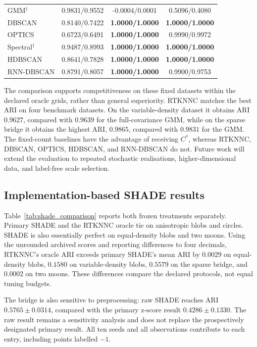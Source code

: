 \documentclass[pdflatex,sn-basic,Numbered]{sn-jnl}
\begin{document}
\begin{table}[t]
\begin{tabular}{@{}lccc@{}}
GMM$^\dagger$ & 0.9831/0.9552 & -0.0004/0.0001 & 0.5096/0.4080 \\
DBSCAN & 0.8140/0.7422 & \textbf{1.0000/1.0000} & \textbf{1.0000/1.0000} \\
OPTICS & 0.6723/0.6491 & \textbf{1.0000/1.0000} & 0.9990/0.9972 \\
Spectral$^\dagger$ & 0.9487/0.8993 & \textbf{1.0000/1.0000} & \textbf{1.0000/1.0000} \\
HDBSCAN & 0.8641/0.7828 & \textbf{1.0000/1.0000} & \textbf{1.0000/1.0000} \\
RNN-DBSCAN & 0.8791/0.8057 & \textbf{1.0000/1.0000} & 0.9900/0.9753 \\
\bottomrule
\end{tabular}
\end{table}

The comparison supports competitiveness on these fixed datasets within the
declared oracle grids, rather than general superiority. RTKNNC matches the best ARI on four benchmark datasets. On the
variable-density dataset it obtains ARI $0.9627$, compared with $0.9639$ for
the full-covariance GMM, while on the sparse bridge it obtains the highest ARI,
$0.9865$, compared with $0.9831$ for the GMM. The fixed-count baselines have
the advantage of receiving $C^*$, whereas RTKNNC, DBSCAN, OPTICS, HDBSCAN,
and RNN-DBSCAN do not. Future work will
extend the evaluation to repeated stochastic realisations, higher-dimensional
data, and label-free scale selection.

\subsection{Implementation-based SHADE results}\label{sec:shade_results}



Table~\ref{tab:shade_comparison} reports both frozen treatments separately.
Primary SHADE and the RTKNNC oracle tie on anisotropic blobs and circles.
SHADE is also essentially perfect on equal-density blobs and two moons.
Using the unrounded archived scores and reporting differences to four
decimals, RTKNNC's oracle ARI exceeds primary SHADE's mean ARI by $0.0029$ on
equal-density blobs, $0.1580$ on variable-density blobs, $0.5579$ on the sparse
bridge, and $0.0002$ on two moons. These differences compare the declared
protocols, not equal tuning budgets.

The bridge is also sensitive to preprocessing: raw SHADE reaches ARI
$0.5765\pm0.0314$, compared with the primary z-score result
$0.4286\pm0.1330$. The raw result remains a sensitivity analysis and does not
replace the prospectively designated primary result. All ten seeds and all
observations contribute to each entry, including points labelled $-1$.
\end{document}
